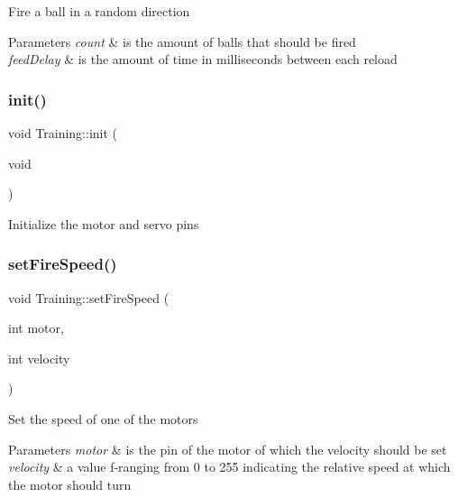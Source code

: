 Fire a ball in a random direction


\begin{DoxyParams}{Parameters}
{\em count} & is the amount of balls that should be fired \\
\hline
{\em feed\+Delay} & is the amount of time in milliseconds between each reload \\
\hline
\end{DoxyParams}
\mbox{\label{namespace_training_a5780d5517d3844d33e2b1580a357f5d7}} 
\subsubsection{\texorpdfstring{init()}{init()}}
{\footnotesize\ttfamily void Training\+::init (\begin{DoxyParamCaption}\item[{void}]{ }\end{DoxyParamCaption})}

Initialize the motor and servo pins \mbox{\label{namespace_training_ae351ffcdd0f27d4185db28a1a15c03f4}} 
\subsubsection{\texorpdfstring{setFireSpeed()}{setFireSpeed()}}
{\footnotesize\ttfamily void Training\+::set\+Fire\+Speed (\begin{DoxyParamCaption}\item[{int}]{motor,  }\item[{int}]{velocity }\end{DoxyParamCaption})}

Set the speed of one of the motors


\begin{DoxyParams}{Parameters}
{\em motor} & is the pin of the motor of which the velocity should be set \\
\hline
{\em velocity} & a value f-\/ranging from 0 to 255 indicating the relative speed at which the motor should turn \\
\hline
\end{DoxyParams}
\mbox{\label{namespace_training_a96a1d8388782f92fc61635d91ef9c897}} 

